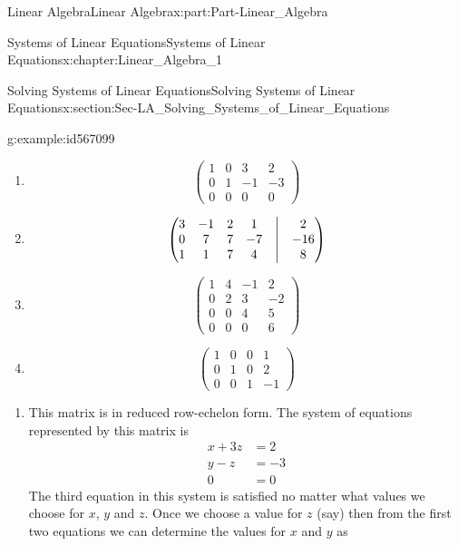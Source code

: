 \documentclass[oneside,10pt,]{book}
\numberwithin{equation}{section}
\newcommand{\amp}{&}
\begin{document}
\begin{partptx}{Linear Algebra}{}{Linear Algebra}{}{}{x:part:Part-Linear_Algebra}
\begin{chapterptx}{Systems of Linear Equations}{}{Systems of Linear Equations}{}{}{x:chapter:Linear_Algebra_1}
\begin{sectionptx}{Solving Systems of Linear Equations}{}{Solving Systems of Linear Equations}{}{}{x:section:Sec-LA_Solving_Systems_of_Linear_Equations}
\begin{example}{}{g:example:id567099}
\par
%
\begin{enumerate}[label=(\alph*).]
\item{}%
\begin{equation*}
\begin{pmatrix} 1 \amp 0 \amp 3 \amp 2 \\ 0 \amp 1 \amp -1 \amp -3 \\ 0 \amp 0 \amp 0 \amp 0 \end{pmatrix} 
\end{equation*}
%
\item{}%
\begin{equation*}
\begin{pmatrix} 3 \amp -1 \amp 2 \amp 1 \amp \bigm| \amp 2 \\ 0 \amp 7 \amp 7 \amp -7 \amp \bigm| \amp -16 \\ 1 \amp 1 \amp 7 \amp 4 \amp \bigm| \amp 8 \end{pmatrix} 
\end{equation*}
%
\item{}%
\begin{equation*}
\begin{pmatrix} 1 \amp 4 \amp -1 \amp 2 \\ 0 \amp 2 \amp 3 \amp -2 \\ 0 \amp 0 \amp 4 \amp 5 \\ 0 \amp 0 \amp 0 \amp 6 \end{pmatrix} 
\end{equation*}
%
\item{}%
\begin{equation*}
\begin{pmatrix} 1 \amp 0 \amp 0 \amp 1 \\ 0 \amp 1 \amp 0 \amp 2 \\ 0 \amp 0 \amp 1 \amp -1 \end{pmatrix} 
\end{equation*}
%
\end{enumerate}
%
\par\smallskip%
\noindent\hypertarget{g:solution:id567148}{}%
\begin{enumerate}[label=(\alph*).]
\item{}This matrix is in reduced row-echelon form. The system of equations represented by this matrix is%
\begin{align*}
x+3z \amp =2\\
y-z \amp =-3\\
0 \amp =0
\end{align*}
The third equation in this system is satisfied no matter what values we choose for \(x\), \(y\) and \(z\). Once we choose a value for \(z\) (say) then from the first two equations we can determine the values for \(x\) and \(y\) as%

\end{enumerate}
\end{example}
\end{sectionptx}
\end{chapterptx}
\end{partptx}
\end{document}
